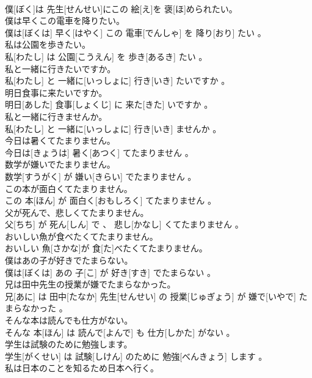 \documentclass[8pt]{extreport}
\begin{document}
\begin{CJK}{UTF8}{min}
\\	僕[ぼく]は 先生[せんせい]にこの 絵[え]を 褒[ほ]められたい。
\\	僕は早くこの電車を降りたい。	
\\	僕は[ぼくは] 早く[はやく] この 電車[でんしゃ] を 降り[おり] たい 。
\\	私は公園を歩きたい。	
\\	私[わたし] は 公園[こうえん] を 歩き[あるき] たい 。
\\	私と一緒に行きたいですか。	
\\	私[わたし] と 一緒に[いっしょに] 行き[いき] たいですか 。
\\	明日食事に来たいですか。	
\\	明日[あした] 食事[しょくじ] に 来た[きた] いですか 。
\\	私と一緒に行きませんか。	
\\	私[わたし] と 一緒に[いっしょに] 行き[いき] ませんか 。
\\	今日は暑くてたまりません。	
\\	今日は[きょうは] 暑く[あつく] てたまりません 。
\\	数学が嫌いでたまりません。	
\\	数学[すうがく] が 嫌い[きらい] でたまりません 。
\\	この本が面白くてたまりません。	
\\	この 本[ほん] が 面白く[おもしろく] てたまりません 。
\\	父が死んで、悲しくてたまりません。	
\\	父[ちち] が 死ん[しん] で 、 悲し[かなし] くてたまりません 。
\\	おいしい魚が食べたくてたまりません。	
\\	おいしい 魚[さかな]が 食[た]べたくてたまりません。
\\	僕はあの子が好きでたまらない。	
\\	僕は[ぼくは] あの 子[こ] が 好き[すき] でたまらない 。
\\	兄は田中先生の授業が嫌でたまらなかった。	
\\	兄[あに] は 田中[たなか] 先生[せんせい] の 授業[じゅぎょう] が 嫌で[いやで] たまらなかった 。
\\	そんな本は読んでも仕方がない。	
\\	そんな 本[ほん] は 読んで[よんで] も 仕方[しかた] がない 。
\\	学生は試験のために勉強します。	
\\	学生[がくせい] は 試験[しけん] のために 勉強[べんきょう] します 。
\\	私は日本のことを知るため日本へ行く。	

\end{CJK}
\end{document}
